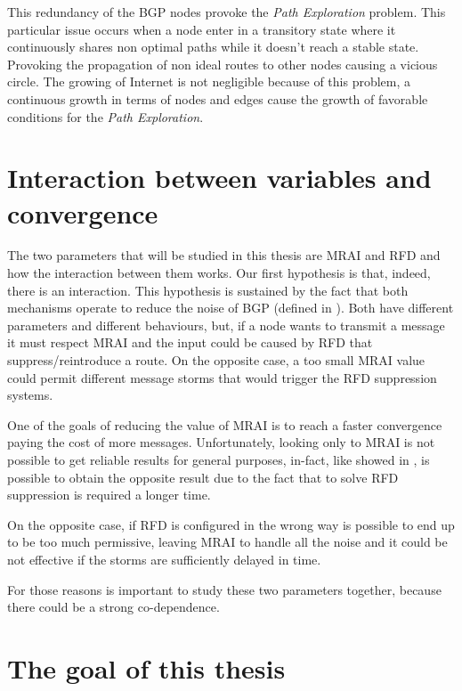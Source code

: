 This redundancy of the \ac{BGP} nodes provoke the \textit{Path Exploration}
problem.
This particular issue occurs when a node enter in a transitory state where it
continuously shares non optimal paths while it doesn't reach a stable state.
Provoking the propagation of non ideal routes to other nodes causing a vicious
circle.
The growing of Internet is not negligible because of this problem, a continuous
growth in terms of nodes and edges cause the growth of favorable conditions for
the \textit{Path Exploration}.

\section{Interaction between variables and convergence}
\label{sec:bgp_correlations}

The two parameters that will be studied in this thesis are \ac{MRAI} and \ac{RFD}
and how the interaction between them works.
Our first hypothesis is that, indeed, there is an interaction.
This hypothesis is sustained by the fact that both mechanisms operate to
reduce the noise of \ac{BGP} (defined in ).
Both have different parameters and different behaviours,
but, if a node wants to transmit a message it must respect \ac{MRAI} and the input
could be caused by \ac{RFD} that suppress/reintroduce a route.
On the opposite case, a too small \ac{MRAI} value could permit different message
storms that would trigger the \ac{RFD} suppression systems.

One of the goals of reducing the value of \ac{MRAI} is to reach a faster convergence
paying the cost of more messages.
Unfortunately, looking only to \ac{MRAI} is not possible to get reliable results
for general purposes, in-fact, like showed in , is possible
to obtain the opposite result due to the fact that to solve \ac{RFD} suppression
is required a longer time.

On the opposite case, if \ac{RFD} is configured in the wrong way is possible to
end up to be too much permissive, leaving \ac{MRAI} to handle all the noise and
it could be not effective if the storms are sufficiently delayed in time.

For those reasons is important to study these two parameters together, because
there could be a strong co-dependence.

\section{The goal of this thesis}
\label{sec:thesis_goal}

